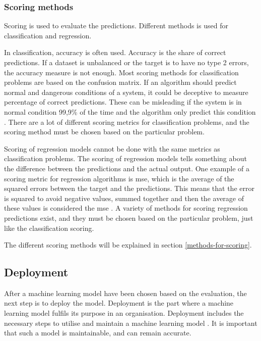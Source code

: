 \documentclass[english, a4paper]{report}
\begin{document}
{{{            \subsubsection{Scoring methods}\label{scoringMethods}
            {   
                Scoring is used to evaluate the predictions. Different methods is used for classification and regression.
                \par 
                In classification, accuracy is often used. Accuracy is the share of correct predictions. If a dataset is unbalanced or the target is to have no type 2 errors, the accuracy measure is not enough. Most scoring methods for classification problems are based on the confusion matrix. If an algorithm should predict normal and dangerous conditions of a system, it could be deceptive to measure percentage of correct predictions. These can be misleading if the system is in normal condition 99,9\% of the time and the algorithm only predict this condition \cite{mlKelleher}. There are a lot of different scoring metrics for classification problems, and the scoring method must be chosen based on the particular problem.
                \par 
                Scoring of regression models cannot be done with the same metrics as classification problems. The scoring of regression models tells something about the difference between the predictions and the actual output. One example of a scoring metric for regression algorithms is \gls{mse}, which is the average of the squared errors between the target and the predictions. This means that the error is squared to avoid negative values, summed together and then the average of these values is considered the \gls{mse} \cite{mlKelleher}. A variety of methods for scoring regression predictions exist, and they must be chosen based on the particular problem, just like the classification scoring.
                \par 
                The different scoring methods will be explained in section \ref{methods-for-scoring}. 
            }
        }
        
        \subsection{Deployment} \label{deployment}
        {
            After a machine learning model have been chosen based on the evaluation, the next step is to deploy the model. Deployment is the part where a machine learning model fulfils its purpose in an organisation. Deployment includes the necessary steps to utilise and maintain a machine learning model \cite{mlKelleher}. It is important that such a model is maintainable, and can remain accurate. 
            \par
            
}}}
\end{document}
